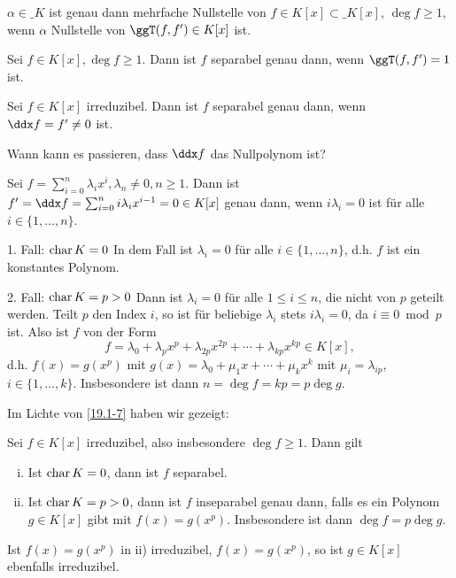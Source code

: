 \begin{kor} \label{19.1-5}
	$\alpha \in \_K$ ist genau dann mehrfache Nullstelle von $f \in K[x] \subset \_K[x]$, $\deg f \ge 1$, wenn $\alpha$ Nullstelle von $\ggT(f, f') \in K[x]$ ist.
\end{kor}

\begin{kor} \label{dup:19.1-6}
	Sei $f \in K[x], \deg f \ge 1$.
	Dann ist $f$ separabel genau dann, wenn $\ggT(f, f') = 1$ ist.
\end{kor}

\begin{kor} \label{19.1-7}
	Sei $f \in K[x]$ irreduzibel.
	Dann ist $f$ separabel genau dann, wenn $\ddx f = f' \neq 0$ ist.
\end{kor}

Wann kann es passieren, dass $\ddx f$ das Nullpolynom ist?

Sei $f = \sum_{i=0}^n \lambda_i x^i, \lambda_n \neq 0, n \ge 1$.
Dann ist $f' = \ddx f = \sum_{i=0}^n i \lambda_i x^{i-1} = 0 \in K[x]$ genau dann, wenn $i \lambda_i = 0$ ist für alle $i \in \{1, \dotsc, n\}$.
\begin{seg}{1. Fall: $\operatorname{char} K = 0$}
	In dem Fall ist $\lambda_i = 0$ für alle $i \in \{1, \dotsc, n\}$, d.h. $f$ ist ein konstantes Polynom.
\end{seg}
\begin{seg}{2. Fall: $\operatorname{char} K = p > 0$}
	Dann ist $\lambda_i = 0$ für alle $1 \le i \le n$, die nicht von $p$ geteilt werden.
	Teilt $p$ den Index $i$, so ist für beliebige $\lambda_i$ stets $i \lambda_i = 0$, da $i \equiv 0 \bmod p$ ist.
	Also ist $f$ von der Form
	\[
		f = \lambda_0 + \lambda_p x^p + \lambda_{2p} x^{2p} + \dotsb + \lambda_{kp} x^{kp} \in K[x],
	\]
	d.h. $f(x) = g(x^p)$ mit $g(x) = \lambda_0 + \mu_1 x + \dotsb + \mu_k x^k$ mit $\mu_i = \lambda_{ip}$, $i \in \{1, \dotsc, k\}$.
	Insbesondere ist dann $n = \deg f = kp = p \deg g$.
\end{seg}

Im Lichte von \ref{19.1-7} haben wir gezeigt:

\begin{st} \label{dup:19.1-8}
	Sei $f \in K[x]$ irreduzibel, also insbesondere $\deg f \ge 1$.
	Dann gilt
	\begin{enumerate}[i)]
		\item
			Ist $\operatorname{char} K = 0$, dann ist $f$ separabel.
		\item
			Ist $\operatorname{char} K = p > 0$, dann ist $f$ inseparabel genau dann, falls es ein Polynom $g \in K[x]$ gibt mit $f(x) = g(x^p)$.
			Insbesondere ist dann $\deg f = p \deg g$.
	\end{enumerate}
	Ist $f(x) = g(x^p)$ in ii) irreduzibel, $f(x) = g(x^p)$, so ist $g \in K[x]$ ebenfalls irreduzibel.
\end{st}

